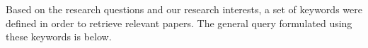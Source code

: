 Based on the research questions and our research interests, a set of keywords were defined in order to 
retrieve relevant papers.
The general query formulated using these keywords is below.
\medskip

